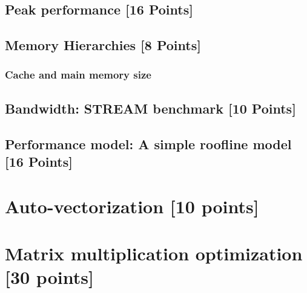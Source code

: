 \documentclass[unicode,10pt,a4paper,oneside,numbers=endperiod,openany]{scrartcl}
\begin{document}
\newpage
\subsection{Peak performance [16 Points]}


\newpage
\subsection{Memory Hierarchies [8 Points]}


\subsubsection{Cache and main memory size}


\subsection{Bandwidth: STREAM benchmark [10 Points]}


\subsection{Performance model: A simple roofline model [16 Points]}


\section{Auto-vectorization [10 points]}


\section{Matrix multiplication optimization [30 points]}
\end{document}
